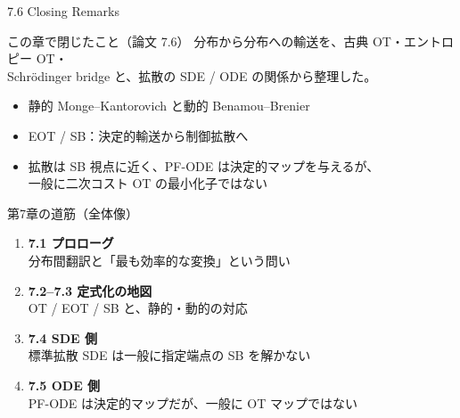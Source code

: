 ﻿%


\begin{frame}{7.6 Closing Remarks}
    \begin{block}{この章で閉じたこと（論文 7.6）}
        分布から分布への輸送を、古典 OT・エントロピー OT・\\
        Schr\"odinger bridge と、拡散の SDE / ODE の関係から整理した。
    \end{block}
    \begin{itemize}
        \item 静的 Monge--Kantorovich と動的 Benamou--Brenier
        \item EOT / SB：決定的輸送から制御拡散へ
        \item 拡散は SB 視点に近く、PF-ODE は決定的マップを与えるが、\\
        一般に二次コスト OT の最小化子ではない
    \end{itemize}
\end{frame}
\asmain
\begin{frame}{第7章の道筋（全体像）}
    \begin{enumerate}
        \item \textbf{7.1 プロローグ}\\
        分布間翻訳と「最も効率的な変換」という問い
        \item \textbf{7.2--7.3 定式化の地図}\\
        OT / EOT / SB と、静的・動的の対応
        \item \textbf{7.4 SDE 側}\\
        標準拡散 SDE は一般に指定端点の SB を解かない
        \item \textbf{7.5 ODE 側}\\
        PF-ODE は決定的マップだが、一般に OT マップではない
    \end{enumerate}
\end{frame}
\asmain
